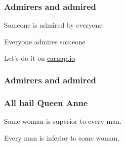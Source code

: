 \begin{frame}
    \frametitle{Admirers and admired}

\begin{earg}
\item[] Someone is admired by everyone
\item[\therefore] Everyone admires someone
\end{earg}

\bigskip
\begin{fitchproof}
\end{fitchproof}
Let's do it on \href{https://carnap.io/shared/rzach@ucalgary.ca/Practice\%20Problems\%20VII.md}{carnap.io}
\end{frame}

\begin{frame}
  \frametitle{Admirers and admired}

  \begin{fitchproof}
    \open
    \close
  \end{fitchproof}
\end{frame}

\begin{frame}
    \frametitle{All hail Queen Anne}

\begin{earg}
\item[] Some woman is superior to every man.
\item[\therefore] Every man is inferior to some woman.
\end{earg}

\bigskip

\begin{fitchproof}
\end{fitchproof}
\end{frame}

